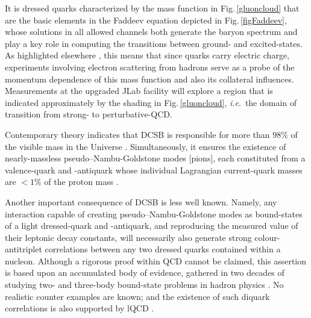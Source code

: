 It is dressed quarks characterized by the mass function in Fig.\,\ref{gluoncloud} that are the basic elements in the Faddeev equation depicted in Fig.\,\ref{figFaddeev}, whose solutions in all allowed channels both generate the baryon spectrum and play a key role in computing the transitions between ground- and excited-states.
%
As highlighted elsewhere \cite{Cloet:2013gva, Binosi:2016wcx}, this means that since quarks carry electric charge, experiments involving electron scattering from hadrons serve as a probe of the momentum dependence of this mass function and also its collateral influences.  Measurements at the upgraded JLab facility will explore a region that is indicated approximately by the shading in Fig.\,\ref{gluoncloud}, \emph{i.e}.\ the domain of transition from strong- to perturbative-QCD.

Contemporary theory indicates that DCSB is responsible for more than 98\% of the visible mass in the Universe \cite{Brodsky:2015aiaRMP}.  Simultaneously, it ensures the existence of nearly-massless pseudo--Nambu-Goldstone modes [pions], each constituted from a valence-quark and -antiquark whose individual Lagrangian current-quark masses are $<1$\% of the proton mass \cite{Maris:1997hd}.

Another important consequence of DCSB is less well known.  Namely, any interaction capable of creating pseudo--Nambu-Goldstone modes as bound-states of a light dressed-quark and -antiquark, and reproducing the measured value of their leptonic decay constants, will necessarily also generate strong colour-antitriplet correlations between any two dressed quarks contained within a nucleon. %
Although a rigorous proof within QCD cannot be claimed, this assertion is based upon an accumulated body of evidence, gathered in two decades of studying two- and three-body bound-state problems in hadron physics \cite{Segovia:2015ufa}.  No realistic counter examples are known; and the existence of such diquark correlations is also supported by lQCD \cite{Alexandrou:2006cq, Babich:2007ah}.

